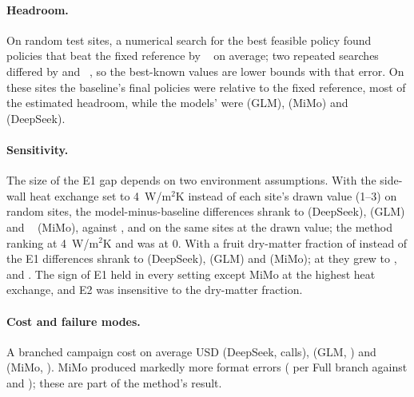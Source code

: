 \paragraph{Headroom.} On  random test sites, a numerical search for the best feasible policy found policies that beat the fixed reference by ~\eur{} on average; two repeated searches differed by  and ~\eur{}, so the best-known values are lower bounds with that error. On these sites the baseline's final policies were  relative to the fixed reference, most of the estimated headroom, while the models' were  (GLM),  (MiMo) and  (DeepSeek).

\paragraph{Sensitivity.} The size of the E1 gap depends on two environment assumptions. With the side-wall heat exchange set to 4~W/m$^2$K instead of each site's drawn value (1--3) on  random sites, the model-minus-baseline differences shrank to  (DeepSeek),  (GLM) and ~\eur{} (MiMo), against ,  and  on the same sites at the drawn value; the method ranking  at 4~W/m$^2$K and was  at 0. With a fruit dry-matter fraction of  instead of  the E1 differences shrank to  (DeepSeek),  (GLM) and  (MiMo); at  they grew to ,  and . The sign of E1 held in every setting except MiMo at the highest heat exchange, and E2 was insensitive to the dry-matter fraction.

\paragraph{Cost and failure modes.} A branched campaign cost on average USD  (DeepSeek,  calls),  (GLM, ) and  (MiMo, ). MiMo produced markedly more format errors ( per Full branch against  and ); these are part of the method's result.
